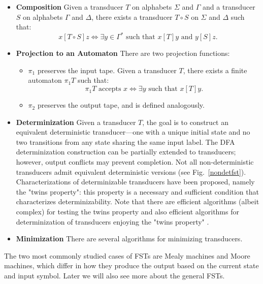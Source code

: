 \begin{itemize}

    \item \textbf{Composition} Given a transducer $T$ on alphabets $\Sigma$ and $\Gamma$ and a transducer $S$ on alphabets $\Gamma$ and $\Delta$, 
    there exists a transducer $T \circ S$ on $\Sigma$ and $\Delta$ such that:
    \[
    x[T \circ S]z \iff \exists y \in \Gamma^* \text{ such that } x[T]y \text{ and } y[S]z.
    \]

    \item \textbf{Projection to an Automaton} There are two projection functions:
    \begin{itemize}
        \item $\pi_1$ preserves the input tape. Given a transducer $T$, there exists a finite automaton $\pi_1 T$ such that:
        \[
        \pi_1 T \text{ accepts } x \iff \exists y \text{ such that } x[T]y.
        \]

        \item $\pi_2$ preserves the output tape, and is defined analogously.
    \end{itemize}

    \item \textbf{Determinization} Given a transducer $T$, the goal is to construct an equivalent deterministic 
    transducer—one with a unique initial state and no two transitions from any state sharing the same input label. 
    The DFA determinization construction can be partially extended to transducers; however, 
    output conflicts may prevent completion. 
    Not all non-deterministic transducers admit equivalent deterministic versions (see Fig.~\ref{nondetfst}). 
    Characterizations of determinizable transducers have been proposed,
    namely the "twins property": this property is  a necessary and
    sufficient condition that characterizes determinizability. Note that
    there are efficient algorithms (albeit complex) for testing the twins
    property \cite{allauzen2003twins} and also
    efficient algorithms for determinization of transducers enjoying the
    "twins property" \cite{mohri1997finite}.


    \item \textbf{Minimization} There are several algorithms for minimizing transducers.

\end{itemize}
The two most commonly studied cases of FSTs are Mealy machines and Moore machines, which differ in how they produce the output based on the current state and input symbol.
Later we will also see more about the general FSTs.

